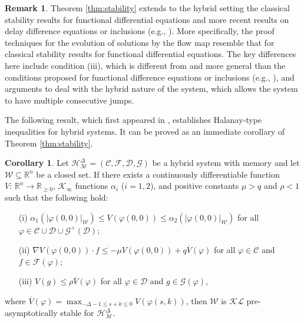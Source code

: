\documentclass[journal,final,twocolumn]{IEEEtran}
\theoremstyle{definition}
\newtheorem{rem}{Remark}
\newtheorem{cor}{Corollary}
\begin{document}
\begin{rem}
Theorem \ref{thm:stability} extends to the hybrid setting the classical stability results for functional differential equations \cite[Theorem 4.2, Chapter 5]{hale1993introduction} and more recent results on delay difference equations or inclusions (e.g., \cite{liu2007razumikhin,gielen2013tractable,gielen2013necessary}). More specifically, the proof techniques for the evolution of solutions by the flow map resemble that for classical stability results for functional differential equations. The key differences here include condition (iii), which is different from and more general than the conditions proposed for functional difference equations or inclusions (e.g., \cite{liu2007razumikhin,gielen2013tractable,gielen2013necessary}), and arguments to deal with the hybrid nature of the system, which allows the system to have multiple consecutive jumps.
\end{rem}

The following result, which first appeared in \cite{liu2014hybrid-ifac}, establishes Halanay-type inequalities \cite{halanay1966differential} for hybrid systems. It can be proved as an immediate corollary of Theorem \ref{thm:stability}.

\begin{cor}\label{cor:stability}\cite{liu2014hybrid-ifac}
Let ${\mathcal{H}_{\mathcal{M}}^{\Delta}}=({\mathcal{C}},{\mathcal{F}},{\mathcal{D}},{\mathcal{G}})$ be a hybrid system with memory and let ${\mathcal{W}}{\subseteq}{\mathbb R}^n$ be a closed set. If there exists a continuously differentiable function $V:\,{\mathbb R}^n{\rightarrow}{\mathbb R}_{\ge 0}$, ${\mathcal{K}}_\infty$ functions $\alpha_i$ ($i=1,2$), and positive constants $\mu>q$ and $\rho<1$ such that the following hold:
\begin{itemize}
\item[(i)] $\alpha_1({\left\vert{{\varphi}(0,0)}\right\vert}_{\mathcal{W}})\le V({\varphi}(0,0))\le \alpha_2({\left\vert{{\varphi}(0,0)}\right\vert}_{\mathcal{W}})$ for all ${\varphi}\in {\mathcal{C}}\cup {\mathcal{D}}\cup{\mathcal{G}}^+({\mathcal{D}})$;
\item[(ii)] $\nabla V({\varphi}(0,0))\cdot f\le -\mu V({\varphi}(0,0))+q\overline{V}({\varphi})$ for all ${\varphi}\in {\mathcal{C}}$ and $f\in{\mathcal{F}}({\varphi})$;
\item[(iii)] $V(g)\le \rho\overline{V}({\varphi})$ for all ${\varphi}\in{\mathcal{D}}$ and $g\in{\mathcal{G}}({\varphi})$,
\end{itemize}
where $\overline{V}({\varphi})=\max_{-\Delta-1\le s+k\le 0} V({\varphi}(s,k))$, then ${\mathcal{W}}$ is ${\mathcal{KL}}$ pre-asymptotically stable for ${\mathcal{H}_{\mathcal{M}}^{\Delta}}$.
\end{cor}
\end{document}
